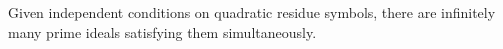 Given independent conditions on quadratic residue symbols, there are infinitely many prime ideals satisfying them simultaneously.
